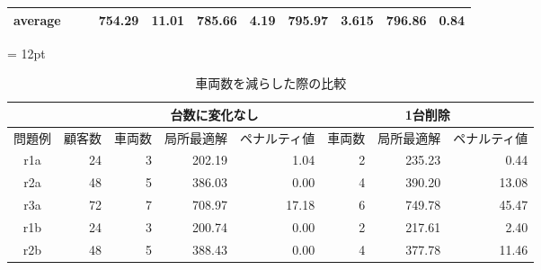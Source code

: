 \begin{landscape}
\begin{table}[]
\begin{tabular}{cllrrrrrrrr}
  average              &                         &                         & 754.29                        & 11.01                         & 785.66                         & 4.19                         & 795.97                         & 3.615                         & 796.86                         & 0.84                        \\ \hline
  \end{tabular}
  \end{table}
\end{landscape}




\begin{landscape}
\begin{table}[]
\tabcolsep = 12pt
\caption{車両数を減らした際の比較}
\label{m-1}
\begin{tabular}{cl|lll|lll}
\hline
                            & \multicolumn{1}{c|}{}    & \multicolumn{3}{c|}{台数に変化なし}                                               & \multicolumn{3}{c}{1台削除}                                                \\ \hline
問題例                          & \multicolumn{1}{c|}{顧客数} & \multicolumn{1}{c}{車両数} & \multicolumn{1}{c}{局所最適解} & \multicolumn{1}{c|}{ペナルティ値} & \multicolumn{1}{c}{車両数} & \multicolumn{1}{c}{局所最適解} & \multicolumn{1}{c}{ペナルティ値} \\ \hline
r1a                         & \multicolumn{1}{r|}{24}  & \multicolumn{1}{r}{3} & \multicolumn{1}{r}{202.19} & \multicolumn{1}{r|}{1.04}  & \multicolumn{1}{r}{2} & \multicolumn{1}{r}{235.23} & \multicolumn{1}{r}{0.44}  \\
r2a                         & \multicolumn{1}{r|}{48}  & \multicolumn{1}{r}{5} & \multicolumn{1}{r}{386.03} & \multicolumn{1}{r|}{0.00}  & \multicolumn{1}{r}{4} & \multicolumn{1}{r}{390.20} & \multicolumn{1}{r}{13.08}  \\
r3a                         & \multicolumn{1}{r|}{72}  & \multicolumn{1}{r}{7} & \multicolumn{1}{r}{708.97} & \multicolumn{1}{r|}{17.18}  & \multicolumn{1}{r}{6} & \multicolumn{1}{r}{749.78} & \multicolumn{1}{r}{45.47}  \\
r1b                       & \multicolumn{1}{r|}{24}  & \multicolumn{1}{r}{3} & \multicolumn{1}{r}{200.74} & \multicolumn{1}{r|}{0.00}  & \multicolumn{1}{r}{2} & \multicolumn{1}{r}{217.61} & \multicolumn{1}{r}{2.40}  \\
r2b                        & \multicolumn{1}{r|}{48}  & \multicolumn{1}{r}{5} & \multicolumn{1}{r}{388.43} & \multicolumn{1}{r|}{0.00}  & \multicolumn{1}{r}{4} & \multicolumn{1}{r}{377.78} & \multicolumn{1}{r}{11.46}  \\

\end{tabular}
\end{table}
\end{landscape}
